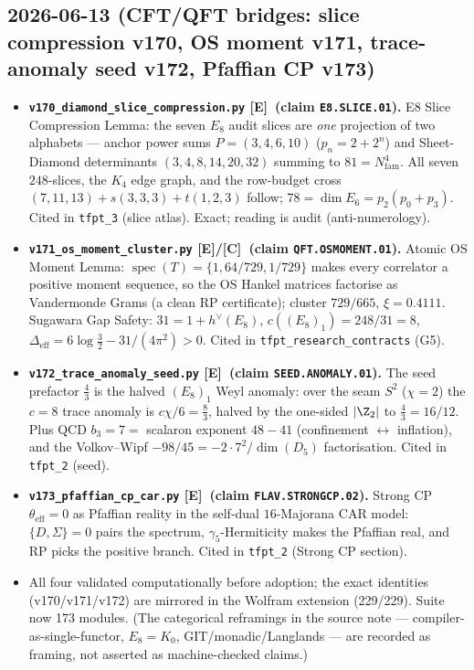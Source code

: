 \documentclass[11pt]{article}
\providecommand{\mE}{\textbf{[E]}}\providecommand{\mC}{\textbf{[C]}}
\begin{document}
\subsection*{2026-06-13 (CFT/QFT bridges: slice compression v170, OS moment v171, trace-anomaly seed v172, Pfaffian CP v173)}
\begin{itemize}
\item \textbf{\texttt{v170\_diamond\_slice\_compression.py} \mE\ (claim \texttt{E8.SLICE.01}).}
  E8 Slice Compression Lemma: the seven $E_8$ audit slices are \emph{one} projection of two
  alphabets --- anchor power sums $P=(3,4,6,10)$ ($p_n=2+2^n$) and Sheet-Diamond determinants
  $(3,4,8,14,20,32)$ summing to $81=N_{\mathrm{fam}}^4$. All seven $248$-slices, the $K_4$ edge
  graph, and the row-budget cross $(7,11,13)+s(3,3,3)+t(1,2,3)$ follow; $78=\dim E_6=p_2(p_0+p_3)$.
  Cited in \texttt{tfpt\_3} (slice atlas). Exact; reading is audit (anti-numerology).
\item \textbf{\texttt{v171\_os\_moment\_cluster.py} \mE/\mC\ (claim \texttt{QFT.OSMOMENT.01}).}
  Atomic OS Moment Lemma: $\operatorname{spec}(T)=\{1,64/729,1/729\}$ makes every correlator a
  positive moment sequence, so the OS Hankel matrices factorise as Vandermonde Grams (a clean RP
  certificate); cluster $729/665$, $\xi=0.4111$. Sugawara Gap Safety: $31=1+h^\vee(E_8)$,
  $c((E_8)_1)=248/31=8$, $\Delta_{\mathrm{eff}}=6\log\tfrac32-31/(4\pi^2)>0$. Cited in
  \texttt{tfpt\_research\_contracts} (G5).
\item \textbf{\texttt{v172\_trace\_anomaly\_seed.py} \mE\ (claim \texttt{SEED.ANOMALY.01}).}
  The seed prefactor $\tfrac43$ is the halved $(E_8)_1$ Weyl anomaly: over the seam $S^2$ ($\chi=2$)
  the $c=8$ trace anomaly is $c\chi/6=\tfrac83$, halved by the one-sided $|\Z_2|$ to
  $\tfrac43=16/12$. Plus QCD $b_3=7=$ scalaron exponent $48-41$ (confinement $\leftrightarrow$
  inflation), and the Volkov--Wipf $-98/45=-2\cdot7^2/\dim(D_5)$ factorisation. Cited in
  \texttt{tfpt\_2} (seed).
\item \textbf{\texttt{v173\_pfaffian\_cp\_car.py} \mE\ (claim \texttt{FLAV.STRONGCP.02}).}
  Strong CP $\theta_{\mathrm{eff}}=0$ as Pfaffian reality in the self-dual $16$-Majorana CAR model:
  $\{D,\Sigma\}=0$ pairs the spectrum, $\gamma_5$-Hermiticity makes the Pfaffian real, and RP picks
  the positive branch. Cited in \texttt{tfpt\_2} (Strong CP section).
\item All four validated computationally before adoption; the exact identities (v170/v171/v172) are
  mirrored in the Wolfram extension (229/229). Suite now 173 modules. (The categorical reframings
  in the source note --- compiler-as-single-functor, $E_8=K_0$, GIT/monadic/Langlands --- are
  recorded as framing, not asserted as machine-checked claims.)
\end{itemize}
\end{document}
